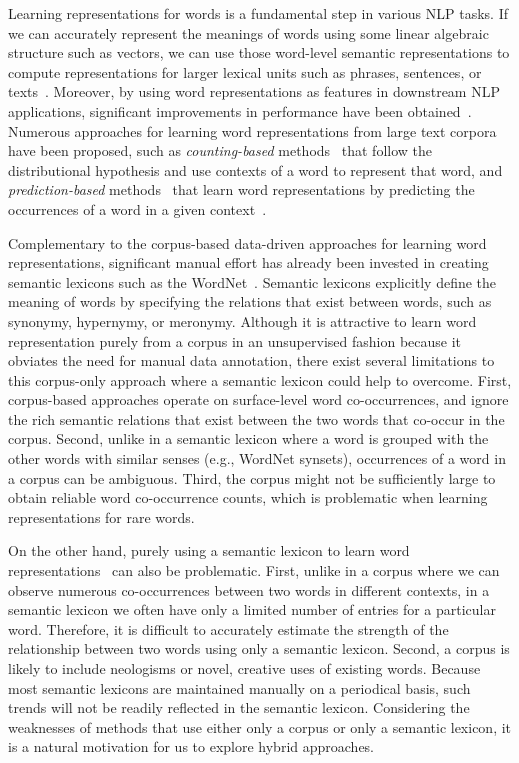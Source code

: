 \documentclass[letterpaper]{article}
\begin{document}
Learning representations for words is a fundamental step in various NLP tasks. If we can accurately represent the meanings of words
using some linear algebraic structure such as vectors, we can use those word-level semantic representations to compute
representations for larger lexical units such as phrases, sentences,
or texts~\cite{socher-EtAl:2012:EMNLP-CoNLL,Le:ICML:2014}.
Moreover, by using word representations as features in downstream NLP applications,
significant improvements in performance have been obtained~\cite{Turian:ACL:2010,Bollegala:ACL:2015,Collobert:2011}.
Numerous approaches for learning word representations from large text corpora have been proposed, such as
\emph{counting-based} methods~\cite{Turney:JAIR:2010} that follow the distributional hypothesis and use contexts
of a word to represent that word, and \emph{prediction-based} methods~\cite{Mikolov:NIPS:2013}
that learn word representations by predicting the occurrences
of a word in a given context~\cite{baroni-dinu-kruszewski:2014:P14-1}.


Complementary to the corpus-based data-driven approaches for learning word representations, significant manual effort has
already been invested in creating semantic lexicons such as the WordNet~\cite{WordNet}.
Semantic lexicons explicitly define the meaning of words by
specifying the relations that exist between words, such as synonymy, hypernymy, or meronymy.
Although it is attractive to learn word representation purely from a corpus in an unsupervised fashion because it obviates the need
for manual data annotation, there exist several limitations to this corpus-only approach where a semantic lexicon could help to overcome.
First, corpus-based approaches operate on surface-level word co-occurrences, and ignore the rich semantic relations that exist
between the two words that co-occur in the corpus.
Second, unlike in a semantic lexicon where a word is grouped with the other words with similar senses (e.g., WordNet synsets),
occurrences of a word in a corpus can be ambiguous. Third, the corpus might not be sufficiently large to obtain reliable
word co-occurrence counts, which is problematic when learning representations for rare words.

On the other hand, purely using a semantic lexicon to learn word representations~\cite{Bollegala:AAAI:2015} can also be problematic.
First, unlike in a corpus where we can observe numerous co-occurrences between two words in different contexts,
in a semantic lexicon we often have only a limited number of entries for a  particular word.
Therefore, it is difficult to accurately estimate the strength of the relationship between two words using only a semantic lexicon.
Second, a corpus is likely to include neologisms or novel, creative uses of existing words.
Because most semantic lexicons are maintained manually on a periodical basis, such trends will not be readily reflected in the semantic lexicon.
Considering the weaknesses of methods that use either only a corpus or only a semantic lexicon, it is a natural motivation for us to
explore hybrid approaches.
\end{document}
